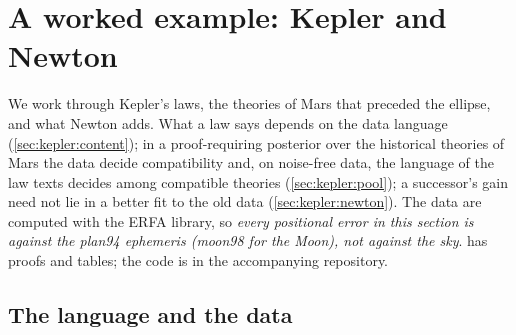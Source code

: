 \section{A worked example: Kepler and Newton}\label{sec:kepler}

We work through Kepler's laws, the theories of Mars that preceded the ellipse, and what Newton adds. What a law says depends on the data language (\cref{sec:kepler:content}); in a proof-requiring posterior over the historical theories of Mars the data decide compatibility and, on noise-free data, the language of the law texts decides among compatible theories (\cref{sec:kepler:pool}); a successor's gain need not lie in a better fit to the old data (\cref{sec:kepler:newton}). The data are computed with the ERFA library, so \emph{every positional error in this section is against the plan94 ephemeris (moon98 for the Moon), not against the sky}.  has proofs and tables; the code is in the accompanying repository.

\subsection{The language and the data}\label{sec:kepler:language}

